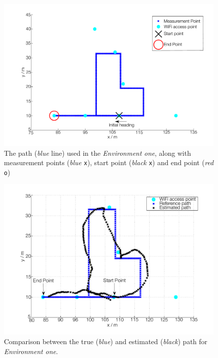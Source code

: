 \documentclass{LTHthesis}
\begin{document}
%
\begin{figure}[!hbt]

\includegraphics[width=1\textwidth ]{images/pure_rssi/env_one}
\caption{The path (\emph{blue} line) used in the \emph{Environment one}, along with measurement points (\emph{blue} \texttt{x}), start point (\emph{black} \texttt{x}) and end point (\emph{red} \texttt{o}) }\label{env_one}
\end{figure}
%
\begin{figure}[!hbt]

\includegraphics[width=1\textwidth ]{images/pure_rssi/true_vs_est_env_1_05}
\caption{Comparison between the true (\emph{blue}) and estimated (\emph{black}) path for \emph{Environment one}.}\label{true_vs_est_env_1_05}
\end{figure}
%
\end{document}
